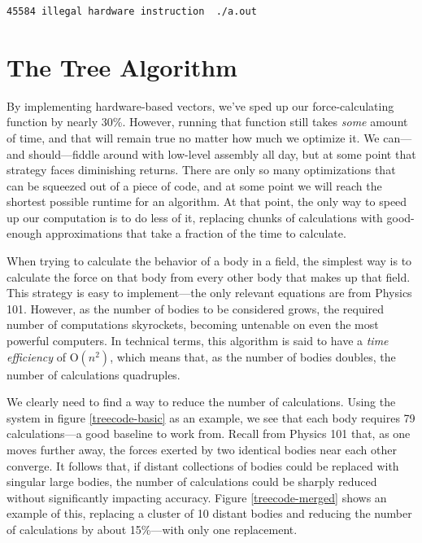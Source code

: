 \documentclass[12pt,twoside]{reedthesis}
\begin{document}
\begin{lstlisting}[caption={An error thrown by an unsupported instruction on OS X. Running vector code on an unsupported processor would lead to something like this.\label{SIGILL}}]
	45584 illegal hardware instruction  ./a.out
\end{lstlisting}

\section{The Tree Algorithm}

By implementing hardware-based vectors, we've sped up our force-calculating function by nearly 30\%. However, running that function still takes \emph{some} amount of time, and that will remain true no matter how much we optimize it. We can---and should---fiddle around with low-level assembly all day, but at some point that strategy faces diminishing returns. There are only so many optimizations that can be squeezed out of a piece of code, and at some point we will reach the shortest possible runtime for an algorithm. At that point, the only way to speed up our computation is to do less of it, replacing chunks of calculations with good-enough approximations that take a fraction of the time to calculate.

When trying to calculate the behavior of a body in a field, the simplest way is to calculate the force on that body from every other body that makes up that field. This strategy is easy to implement---the only relevant equations are from Physics 101. However, as the number of bodies to be considered grows, the required number of computations skyrockets, becoming untenable on even the most powerful computers. In technical terms, this algorithm is said to have a \emph{time efficiency} of O$(n^2)$, which means that, as the number of bodies doubles, the number of calculations quadruples.

We clearly need to find a way to reduce the number of calculations. Using the system in figure \ref{treecode-basic} as an example, we see that each body requires 79 calculations---a good baseline to work from. Recall from Physics 101 that, as one moves further away, the forces exerted by two identical bodies near each other converge. It follows that, if distant collections of bodies could be replaced with singular large bodies, the number of calculations could be sharply reduced without significantly impacting accuracy. Figure \ref{treecode-merged} shows an example of this, replacing a cluster of 10 distant bodies and reducing the number of calculations by about 15\%---with only one replacement.
\end{document}
